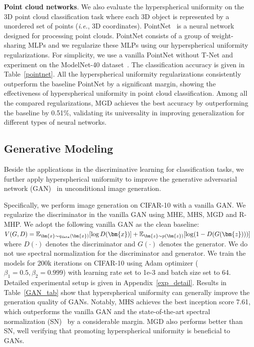 \textbf{Point cloud networks}. We also evaluate the hyperspherical uniformity on the 3D point cloud classification task where each 3D object is represented by a unordered set of points (\emph{i.e.}, 3D coordinates). PointNet~\cite{qi2017pointnet} is a neural network designed for processing point clouds. PointNet consists of a group of weight-sharing MLPs and we regularize these MLPs using our hyperspherical uniformity regularizations. For simplicity, we use a vanilla PointNet without T-Net and experiment on the ModelNet-40 dataset~\cite{wu20153d}. The classification accuracy is given in Table~\ref{pointnet}. All the hyperspherical uniformity regularizations consistently outperform the baseline PointNet by a significant margin, showing the effectiveness of hyperspherical uniformity in point cloud classification. Among all the compared regularizations, MGD achieves the best accuracy by outperforming the baseline by 0.51\%, validating its universality in improving generalization for different types of neural networks.

\subsection{Generative Modeling}

Beside the applications in the discriminative learning for classification tasks, we further apply hyperspherical uniformity to improve the generative adversarial network (GAN)~\cite{goodfellow2014generative} in unconditional image generation.

Specifically, we perform image generation on CIFAR-10 with a vanilla GAN. We regularize the discriminator in the vanilla GAN using MHE, MHS, MGD and R-MHP. We adopt the following vanilla GAN as the clean baseline: $V(G, D) =  \mathbb{E}_{\bm{x}\sim q_{\rm data}(\bm{x})} [ \log D(\bm{x})] +  \mathbb{E}_{\bm{z}\sim p(\bm{z})} [\log(1-D(G(\bm{z})))]$ where $D(\cdot)$ denotes the discriminator and $G(\cdot)$ denotes the generator. We do not use spectral normalization for the discriminator and generator. We train the models for 200k iterations on CIFAR-10 using Adam optimizer ($\beta_1 = 0.5, \beta_2 = 0.999$) with learning rate set to 1e-3 and batch size set to 64. Detailed experimental setup is given in Appendix~\ref{exp_detail}. Results in Table~\ref{GAN_tab} show that hyperspherical uniformity can generally improve the generation quality of GANs. Notably, MHS achieves the best inception score 7.61, which outperforms the vanilla GAN and the state-of-the-art spectral normalization (SN)~\cite{miyato2018spectral} by a considerable margin. MGD also performs better than SN, well verifying that promoting hyperspherical uniformity is beneficial to GANs.

